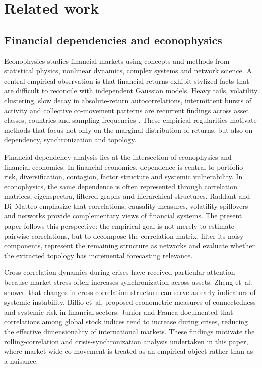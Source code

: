 \section{Related work}
\label{sec:related_work}

\subsection{Financial dependencies and econophysics}

Econophysics studies financial markets using concepts and methods from statistical physics, nonlinear dynamics, complex systems and network science. A central empirical observation is that financial returns exhibit stylized facts that are difficult to reconcile with independent Gaussian models. Heavy tails, volatility clustering, slow decay in absolute-return autocorrelations, intermittent bursts of activity and collective co-movement patterns are recurrent findings across asset classes, countries and sampling frequencies \cite{mantegna_stanley_1999_book,cont_2001_empirical}. These empirical regularities motivate methods that focus not only on the marginal distribution of returns, but also on dependency, synchronization and topology.

Financial dependency analysis lies at the intersection of econophysics and financial economics. In financial economics, dependence is central to portfolio risk, diversification, contagion, factor structure and systemic vulnerability. In econophysics, the same dependence is often represented through correlation matrices, eigenspectra, filtered graphs and hierarchical structures. Raddant and Di~Matteo \cite{raddant_dimatteo_2023} emphasize that correlations, causality measures, volatility spillovers and networks provide complementary views of financial systems. The present paper follows this perspective: the empirical goal is not merely to estimate pairwise correlations, but to decompose the correlation matrix, filter its noisy components, represent the remaining structure as networks and evaluate whether the extracted topology has incremental forecasting relevance.

Cross-correlation dynamics during crises have received particular attention because market stress often increases synchronization across assets. Zheng et~al. \cite{zheng_2012_changes} showed that changes in cross-correlation structure can serve as early indicators of systemic instability. Billio et~al. \cite{billio_2012_econometric} proposed econometric measures of connectedness and systemic risk in financial sectors. Junior and Franca \cite{junior_2012_correlation} documented that correlations among global stock indices tend to increase during crises, reducing the effective dimensionality of international markets. These findings motivate the rolling-correlation and crisis-synchronization analysis undertaken in this paper, where market-wide co-movement is treated as an empirical object rather than as a nuisance.


